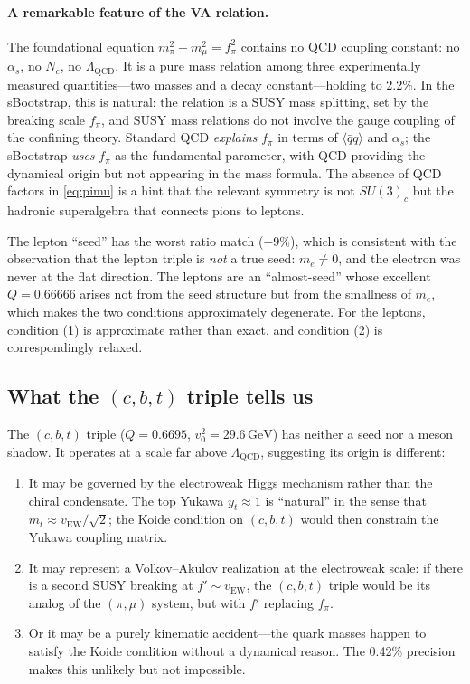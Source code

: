 \documentclass[12pt,a4paper]{article}
\newcommand{\GeV}{\,\text{GeV}}
\newcommand{\qqbar}{\langle\bar{q}q\rangle}
\begin{document}
\paragraph{A remarkable feature of the VA relation.} The 
foundational equation $m_\pi^2 - m_\mu^2 = f_\pi^2$ contains 
no QCD coupling constant: no $\alpha_s$, no $N_c$, no 
$\Lambda_{\text{QCD}}$. It is a pure mass relation among three 
experimentally measured quantities---two masses and a decay 
constant---holding to 2.2\%. In the sBootstrap, this is natural: 
the relation is a SUSY mass splitting, set by the breaking 
scale $f_\pi$, and SUSY mass relations do not involve the gauge 
coupling of the confining theory. Standard QCD \emph{explains} 
$f_\pi$ in terms of $\qqbar$ and $\alpha_s$; the sBootstrap 
\emph{uses} $f_\pi$ as the fundamental parameter, with QCD 
providing the dynamical origin but not appearing in the mass 
formula. The absence of QCD factors in \eqref{eq:pimu} is a 
hint that the relevant symmetry is not $SU(3)_c$ but the 
hadronic superalgebra that connects pions to leptons.

The lepton ``seed'' has the worst ratio match ($-9\%$), which 
is consistent with the observation that the lepton triple is 
\emph{not} a true seed: $m_e \neq 0$, and the electron was never 
at the flat direction. The leptons are an ``almost-seed'' whose 
excellent $Q = 0.66666$ arises not from the seed structure but 
from the smallness of $m_e$, which makes the two conditions 
approximately degenerate. For the leptons, condition (1) is 
approximate rather than exact, and condition (2) is correspondingly 
relaxed.

\subsection{What the $(c,b,t)$ triple tells us}

The $(c,b,t)$ triple ($Q = 0.6695$, $v_0^2 = 29.6\GeV$) has 
neither a seed nor a meson shadow. It operates at a scale far 
above $\Lambda_{\text{QCD}}$, suggesting its origin is different:

\begin{enumerate}
\item It may be governed by the electroweak Higgs mechanism rather 
than the chiral condensate. The top Yukawa $y_t \approx 1$ is 
``natural'' in the sense that $m_t \approx v_{\text{EW}}/\sqrt{2}$; 
the Koide condition on $(c,b,t)$ would then constrain the Yukawa 
coupling matrix.
\item It may represent a Volkov--Akulov realization at the 
electroweak scale: if there is a second SUSY breaking at 
$f' \sim v_{\text{EW}}$, the $(c,b,t)$ triple would be its 
analog of the $(\pi, \mu)$ system, but with $f'$ replacing $f_\pi$.
\item Or it may be a purely kinematic accident---the quark masses 
happen to satisfy the Koide condition without a dynamical reason. 
The 0.42\% precision makes this unlikely but not impossible.
\end{enumerate}
\end{document}

